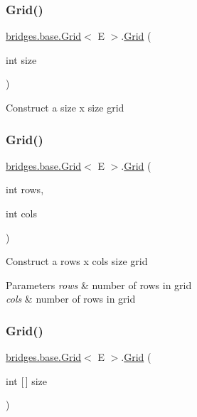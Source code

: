 \subsubsection{\texorpdfstring{Grid()}{Grid()}\hspace{0.1cm}{\footnotesize\ttfamily [2/4]}}
{\footnotesize\ttfamily \hyperlink{classbridges_1_1base_1_1_grid}{bridges.\+base.\+Grid}$<$ E $>$.\hyperlink{classbridges_1_1base_1_1_grid}{Grid} (\begin{DoxyParamCaption}\item[{int}]{size }\end{DoxyParamCaption})}

Construct a size x size grid \mbox{\label{classbridges_1_1base_1_1_grid_a43a699bd7ae2c6c986f978c515ff97d8}} 
\subsubsection{\texorpdfstring{Grid()}{Grid()}\hspace{0.1cm}{\footnotesize\ttfamily [3/4]}}
{\footnotesize\ttfamily \hyperlink{classbridges_1_1base_1_1_grid}{bridges.\+base.\+Grid}$<$ E $>$.\hyperlink{classbridges_1_1base_1_1_grid}{Grid} (\begin{DoxyParamCaption}\item[{int}]{rows,  }\item[{int}]{cols }\end{DoxyParamCaption})}

Construct a rows x cols size grid


\begin{DoxyParams}{Parameters}
{\em rows} & number of rows in grid \\
\hline
{\em cols} & number of rows in grid \\
\hline
\end{DoxyParams}
\mbox{\label{classbridges_1_1base_1_1_grid_ab9975b28d8dda7f3fbe0e35a7a026772}} 
\subsubsection{\texorpdfstring{Grid()}{Grid()}\hspace{0.1cm}{\footnotesize\ttfamily [4/4]}}
{\footnotesize\ttfamily \hyperlink{classbridges_1_1base_1_1_grid}{bridges.\+base.\+Grid}$<$ E $>$.\hyperlink{classbridges_1_1base_1_1_grid}{Grid} (\begin{DoxyParamCaption}\item[{int \mbox{[}$\,$\mbox{]}}]{size }\end{DoxyParamCaption})}

